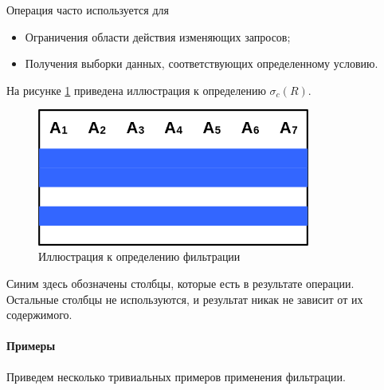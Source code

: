 Операция часто используется для
\begin{itemize}
	\item Ограничения области действия изменяющих запросов;
	\item Получения выборки данных, соответствующих определенному условию.
\end{itemize}

На рисунке \ref{sel-def} приведена иллюстрация к определению $\sigma_c(R)$.

\begin{figure}[H]
	\centering

	\includegraphics[width=0.8\textwidth]{../assets/kgeorgiy/relalgebra/Primitive_Section_0.svg.png}
	\caption{Иллюстрация к определению фильтрации}
	\label{sel-def}
\end{figure}

Синим здесь обозначены столбцы, которые есть в результате операции. Остальные столбцы не используются, и результат никак не зависит от их содержимого.

\paragraph{Примеры}
Приведем несколько тривиальных примеров применения фильтрации.

